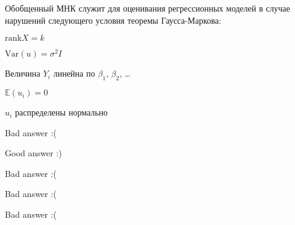 
\begin{question}
Обобщенный МНК служит для оценивания регрессионных моделей в случае нарушений следующего условия теоремы Гаусса-Маркова:
\begin{answerlist}
  \item \(\mathrm{rank} X = k\)
  \item \(\mathrm{Var}(u) = \sigma^2 I\)
  \item Величина \(Y_i\) линейна по \(\beta_1\), \(\beta_2\), \ldots
  \item \(\mathbb{E}(u_i)=0\)
  \item \(u_i\) распределены нормально
\end{answerlist}
\end{question}

\begin{solution}
\begin{answerlist}
  \item Bad answer :(
  \item Good answer :)
  \item Bad answer :(
  \item Bad answer :(
  \item Bad answer :(
\end{answerlist}
\end{solution}

